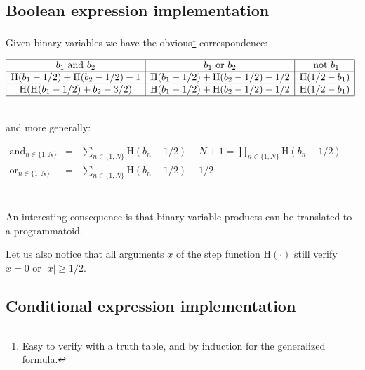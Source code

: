 \documentclass[a4]{article} \usepackage[left=2cm,right=3cm,top=1cm,bottom=2cm]{geometry}
\newcommand{\eqline}[1]{~\vspace{0.1cm}\\\centerline{$#1$}\vspace{0.1cm}\\}
\begin{document}
\subsection{Boolean expression implementation}

Given binary variables we have the obvious\footnote{Easy to verify with a truth table, and by induction for the generalized formula.} correspondence:
\eqline{\begin{array}{|c|c|c|} \hline
    b_1 \mbox{ and } b_2           &  b_1 \mbox{ or } b_2   & \mbox{ not } b_1 \\ \hline
   \mbox{H}(b_1 - 1/2) + \mbox{H}(b_2 - 1/2) - 1  & \mbox{H}(b_1 - 1/2) +  \mbox{H}(b_2 - 1/2) - 1/2       & \mbox{H}(1/2 - b_1) \\ \hline
    \mbox{H}(\mbox{H}(b_1 - 1/2) + b_2 - 3/2)  & \mbox{H}(b_1 - 1/2) +  \mbox{H}(b_2 - 1/2) - 1/2       & \mbox{H}(1/2 - b_1) \\ \hline
\end{array}} and more generally:
\eqline{\begin{array}{rcl}
    \mbox{and}_{n \in \{1, N\}} &=& \sum_{n \in \{1, N\}} \mbox{H}(b_n - 1/2) - N + 1 = \prod_{n \in \{1,  N\}} \mbox{H}(b_n - 1/2) \\
    \mbox{or}_{n \in \{1, N\}} &=& \sum_{n \in \{1, N\}} \mbox{H}(b_n - 1/2) - 1/2 \\
\end{array}}

An interesting consequence is that binary variable products can be translated to a programmatoid.

Let us also notice that all arguments $x$ of the step function $\mbox{H}(\cdot)$ still verify $x=0$ or $|x| \ge 1/2$.

\subsection{Conditional expression implementation}
\end{document}
